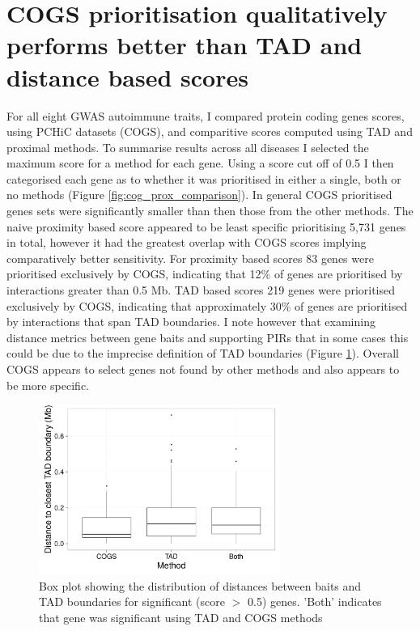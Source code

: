 \documentclass[a4paper,11pt]{report}
\begin{document}
\section{COGS prioritisation qualitatively performs better than TAD and distance based scores}
For all eight GWAS autoimmune traits, I compared protein coding genes scores, using PCHiC datasets (COGS), and comparitive scores computed using TAD and proximal methods. To summarise results across all diseases I selected the maximum score for a method for each gene. Using a score cut off of 0.5 I then categorised each gene as to whether it was prioritised in either a single, both or no methods (Figure \ref{fig:cog_prox_comparison}). In general COGS prioritised genes sets were significantly smaller than then those from the other methods. The naive proximity based score appeared to be least specific prioritising 5,731 genes in total, however it had the greatest overlap with COGS scores implying comparatively better sensitivity. For proximity based scores 83 genes were prioritised exclusively by COGS, indicating that 12\% of genes are prioritised by interactions greater than 0.5 Mb. TAD based scores 219 genes were prioritised exclusively by COGS, indicating that approximately 30\% of genes are prioritised by interactions that span TAD boundaries.  I note however that examining distance metrics between gene baits and supporting PIRs that in some cases this could be due to the imprecise definition of TAD boundaries (Figure \ref{fig:distance_distro}). Overall COGS appears to select genes not found by other methods and also appears to be more specific.

\begin{figure}[ht]
\centering
\includegraphics[width=0.7\textwidth]{dist_boxplot.pdf}
\caption{Box plot showing the distribution of distances between baits and TAD boundaries for significant (score $>$ 0.5) genes. ’Both’ indicates that gene was significant using TAD and COGS methods}
\label{fig:distance_distro}
\end{figure}
\end{document}

